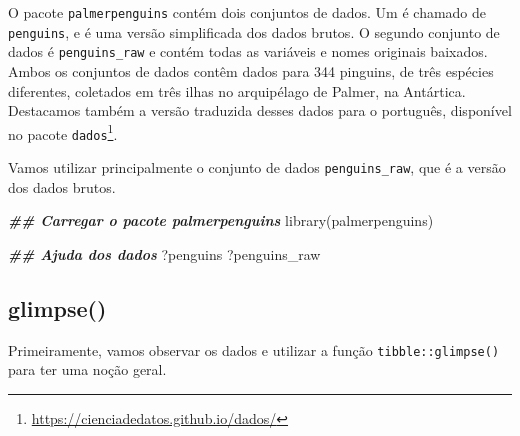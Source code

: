 \documentclass[
]{book}
\newenvironment{Shaded}{\begin{snugshade}}{\end{snugshade}}
\newcommand{\DocumentationTok}[1]{\textcolor[rgb]{0.37,0.37,0.37}{\textbf{\textit{#1}}}}
\newcommand{\FunctionTok}[1]{\textcolor[rgb]{0,0,0}{#1}}
\newcommand{\NormalTok}[1]{#1}
\renewcommand{\href}[2]{#2\footnote{\url{#1}}}
\begin{document}
O pacote \texttt{palmerpenguins} contém dois conjuntos de dados. Um é chamado de \texttt{penguins}, e é uma versão simplificada dos dados brutos. O segundo conjunto de dados é \texttt{penguins\_raw} e contém todas as variáveis e nomes originais baixados. Ambos os conjuntos de dados contêm dados para 344 pinguins, de três espécies diferentes, coletados em três ilhas no arquipélago de Palmer, na Antártica. Destacamos também a versão traduzida desses dados para o português, disponível no pacote \href{https://cienciadedatos.github.io/dados/}{\texttt{dados}}.

Vamos utilizar principalmente o conjunto de dados \texttt{penguins\_raw}, que é a versão dos dados brutos.

\begin{Shaded}
\begin{Highlighting}[]
\DocumentationTok{\#\# Carregar o pacote palmerpenguins}
\FunctionTok{library}\NormalTok{(palmerpenguins)}

\DocumentationTok{\#\# Ajuda dos dados}
\NormalTok{?penguins}
\NormalTok{?penguins\_raw}
\end{Highlighting}
\end{Shaded}

\hypertarget{glimpse}{%
\subsection{glimpse()}\label{glimpse}}

Primeiramente, vamos observar os dados e utilizar a função \texttt{tibble::glimpse()} para ter uma noção geral.
\end{document}
